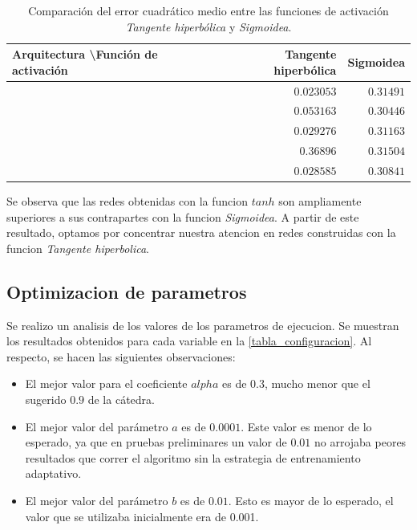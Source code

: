\documentclass[a4paper,10pt]{article}
\begin{document}
     \begin{table}[H]
        \label{table-comparation-act-functions}

        \begin{center}
        \begin{tabular}{|l|r|r|}
            \hline
            Arquitectura \textbackslash Función de activación & Tangente hiperbólica & Sigmoidea \\
            \hline
            [2 5 4 1] & $0.023053$ & $0.31491$ \\
            \hline
            [3 10 6 1] & $0.053163$ & $0.30446$  \\
            \hline
            [2 10 6 1] & $0.029276$ & $0.31163$  \\
            \hline
            [2 4 2 1]  & $0.36896$ & $0.31504$  \\
            \hline
            [3 14 8 1] & $0.028585$ & $0.30841$  \\
            \hline
        \end{tabular}
        \end{center}
        \caption{Comparación del error cuadrático medio entre las funciones de activación \textit{Tangente hiperbólica} y \textit{Sigmoidea}.}

    \end{table}

    Se observa que las redes obtenidas con la funcion $tanh$ son ampliamente superiores a sus contrapartes con la funcion \textit{Sigmoidea}.
    A partir de este resultado, optamos por concentrar nuestra atencion en redes construidas con la funcion \textit{Tangente hiperbolica}.

    \subsection{Optimizacion de parametros}

        Se realizo un analisis de los valores de los parametros de ejecucion. Se muestran los resultados obtenidos para cada variable en la \ref{tabla_configuracion}. 
        Al respecto, se hacen las siguientes observaciones:

        \begin{itemize}
        \item El mejor valor para el coeficiente $alpha$ es de $0.3$, mucho menor que el sugerido $0.9$ de la cátedra.
        \item El mejor valor del parámetro $a$ es de $0.0001$. Este valor es menor de lo esperado, ya que en pruebas preliminares un valor de $0.01$ 
              no arrojaba peores resultados que correr el algoritmo sin la estrategia de entrenamiento adaptativo.
        \item El mejor valor del parámetro $b$ es de $0.01$. Esto es mayor de lo esperado, el valor que se utilizaba inicialmente era de 0.001.
        \end{itemize}
\end{document}
